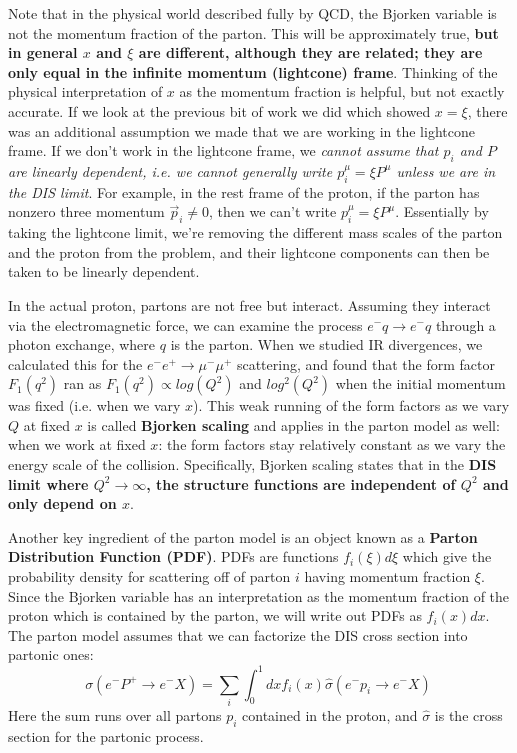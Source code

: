 \documentclass[11pt, oneside]{article}   	%
\theoremstyle{definition}
\begin{document}
Note that in the physical world described fully by QCD, the Bjorken variable is not the momentum fraction of the 
parton. This will be approximately true, \textbf{but in general $x$ and $\xi$ are different, although they are related; they are 
only equal in the infinite momentum (lightcone) frame}. Thinking of the physical interpretation of $x$ as the momentum fraction 
is helpful, but not exactly accurate. If we look at the previous bit of work we did which showed $x = \xi$, there was an additional 
assumption we made that we are working in the lightcone frame. If we don't work in the lightcone frame, we \textit{cannot assume 
that $p_i$ and $P$ are linearly dependent, i.e. we cannot generally write $p_i^\mu = \xi P^\mu$ unless we are in the DIS limit}. 
For example, in the rest frame of the proton, if the parton has nonzero three momentum $\vec p_i\neq 0$, then we can't write 
$p_i^\mu = \xi P^\mu$. Essentially by taking the lightcone limit, we're removing the different mass scales of the parton and the proton 
from the problem, and their lightcone components can then be taken to be linearly dependent. 

In the actual proton, partons are not free but interact. Assuming they interact via the electromagnetic force, we can 
examine the process $e^-q\rightarrow e^-q$ through a photon exchange, where $q$ is the parton. When we studied IR 
divergences, we calculated this for the $e^-e^+\rightarrow\mu^-\mu^+$ scattering, and found that the form factor $F_1(q^2)$ 
ran as $F_1(q^2)\propto log(Q^2)$ and $log^2(Q^2)$ when the initial momentum was fixed (i.e. when we vary $x$). This weak 
running of the form factors as we vary $Q$ at fixed $x$ is called \textbf{Bjorken scaling} and applies in the parton model as 
well: when we work at fixed $x$: the form factors stay relatively constant as we vary the energy scale of the collision. 
Specifically, Bjorken scaling states that in the \textbf{DIS limit where $Q^2\rightarrow\infty$, the structure functions are 
independent of $Q^2$ and only depend on $x$}.

Another key ingredient of the parton model is an object known as a \textbf{Parton Distribution Function (PDF)}. PDFs are 
functions $f_i(\xi)d\xi$ which give the probability density for scattering off of parton $i$ having momentum fraction $\xi$. Since 
the Bjorken variable has an interpretation as the momentum fraction of the proton which is contained by the parton, we will 
write out PDFs as $f_i(x)dx$. The parton model assumes that we can factorize the DIS cross section into partonic ones:
\begin{equation}
	\sigma(e^- P^+\rightarrow e^- X) = \sum_i\int_0^1dx f_i(x)\hat{\sigma}(e^- p_i\rightarrow e^- X)~
	\label{eq:sigma_pdf}
\end{equation}
Here the sum runs over all partons $p_i$ contained in the proton, and $\hat\sigma$ is the cross section for the partonic 
process. 
\end{document}
